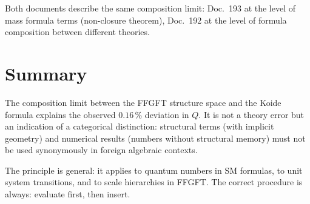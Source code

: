 Both documents describe the same composition limit:
Doc.~193 at the level of mass formula terms (non-closure theorem),
Doc.~192 at the level of formula composition between different theories.

\section*{Summary}

The composition limit between the FFGFT structure space and the Koide formula
explains the observed $0{.}16\,\%$ deviation in $Q$. It is not a theory error
but an indication of a categorical distinction: structural terms (with implicit
geometry) and numerical results (numbers without structural memory) must not
be used synonymously in foreign algebraic contexts.

The principle is general: it applies to quantum numbers in SM formulas,
to unit system transitions, and to scale hierarchies in FFGFT. The correct
procedure is always: evaluate first, then insert.

